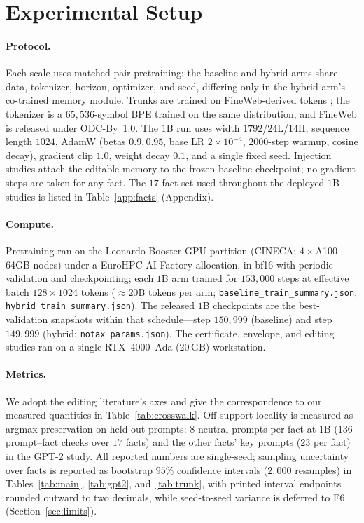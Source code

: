 \documentclass[10pt,twocolumn]{article}
\theoremstyle{remark}
\begin{document}
\section{Experimental Setup}
\label{sec:setup}

\paragraph{Protocol.} Each scale uses matched-pair pretraining: the baseline and
hybrid arms share data, tokenizer, horizon, optimizer, and seed, differing only in
the hybrid arm's co-trained memory module. Trunks are trained on FineWeb-derived
tokens \citep{penedo2024fineweb}; the tokenizer is a $65{,}536$-symbol BPE
trained on the same distribution, and FineWeb is released under ODC-By~1.0. The
$1$B run uses width $1792$/$24$L/$14$H,
sequence length $1024$, AdamW (betas $0.9,0.95$, base LR $2\!\times\!10^{-4}$,
$2000$-step warmup, cosine decay), gradient clip $1.0$, weight decay $0.1$, and a
single fixed seed. Injection studies attach the editable memory to the frozen
baseline checkpoint; no gradient steps are taken for any fact. The $17$-fact
set used throughout the deployed $1$B studies is listed in
Table~\ref{app:facts} (Appendix).

\paragraph{Compute.} Pretraining ran on the Leonardo Booster GPU partition
(CINECA; $4\times$A100-64GB nodes) under a EuroHPC AI Factory allocation, in
bf16 with periodic validation
and checkpointing; each $1$B arm trained for $153{,}000$ steps at effective
batch $128\times1024$ tokens ($\approx20$B
tokens per arm; \texttt{baseline\_train\_summary.json},
\texttt{hybrid\_train\_summary.json}). The released $1$B checkpoints are the
best-validation snapshots within that schedule---step $150{,}999$ (baseline) and
step $149{,}999$ (hybrid; \texttt{notax\_params.json}). The certificate,
envelope, and editing studies ran on a single RTX~4000~Ada (20\,GB)
workstation.

\paragraph{Metrics.} We adopt the editing literature's axes and give the
correspondence to our measured quantities in Table~\ref{tab:crosswalk}.
Off-support locality is measured as argmax preservation on held-out prompts:
$8$ neutral prompts per fact at $1$B ($136$ prompt--fact checks over $17$ facts)
and the other facts' key prompts ($23$ per fact) in the GPT-2 study. All
reported numbers are single-seed; sampling uncertainty over facts is reported as
bootstrap $95\%$ confidence intervals ($2{,}000$ resamples) in
Tables~\ref{tab:main}, \ref{tab:gpt2}, and~\ref{tab:trunk}, with printed
interval endpoints rounded outward to two decimals, while seed-to-seed
variance is deferred to E6 (Section~\ref{sec:limits}).
\end{document}
